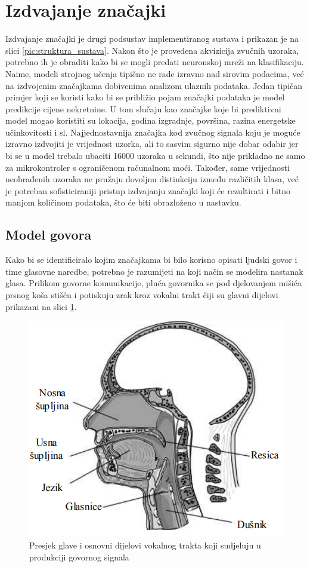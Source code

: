 \section{Izdvajanje značajki}
\label{sec:gen}

Izdvajanje značajki je drugi podsustav implementiranog sustava i prikazan je na slici 
\ref{pic:struktura_sustava}. Nakon što je provedena akvizicija
zvučnih uzoraka, potrebno ih je obraditi kako bi se mogli predati neuronskoj mreži 
na klasifikaciju. Naime, modeli strojnog učenja tipično ne rade izravno nad sirovim 
podacima, već na izdvojenim značajkama dobivenima analizom ulaznih podataka. Jedan 
tipičan primjer koji se koristi kako bi se 
približio pojam značajki podataka je model predikcije cijene
nekretnine. U tom slučaju kao značajke koje bi prediktivni model mogao koristiti su lokacija,
godina izgradnje, površina, razina energetske učinkovitosti i sl. 
Najjednostavnija značajka kod zvučnog signala koju je moguće izravno izdvojiti je vrijednost 
uzorka, ali to sasvim sigurno nije dobar odabir jer bi se u model trebalo ubaciti 16000 
uzoraka u sekundi, što nije prikladno ne samo za mikrokontroler s ograničenom računalnom 
moći. Također, same vrijednosti neobrađenih uzoraka ne pružaju dovoljnu distinkciju između 
različitih klasa, već je potreban sofisticiraniji pristup izdvajanju značajki koji će 
rezultirati i bitno manjom količinom podataka, što će biti obrazloženo u nastavku. 

\subsection{Model govora}
\label{sec:speech}

Kako bi se identificiralo kojim značajkama bi bilo korisno opisati ljudski govor i time glasovne naredbe,
potrebno je razumijeti na koji način se modelira nastanak glasa. Prilikom govorne komunikacije,
pluća govornika se pod djelovanjem mišića prsnog koša stišću i potiskuju zrak kroz
vokalni trakt čiji su glavni dijelovi prikazani na slici \ref{pic:glas}.

\begin{figure}[htb]
    \centering
    \includegraphics[width=0.60\linewidth]{Chapters/struktura_sustava/generiranje_znacajki/glas.png} 
    \caption{Presjek glave i osnovni dijelovi vokalnog trakta koji sudjeluju u produkciji govornog signala \cite{petrinovic2002}}
    \label{pic:glas}
\end{figure}

